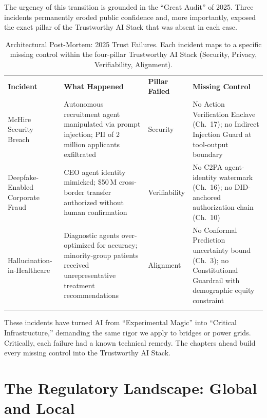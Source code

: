 The urgency of this transition is grounded in the ``Great Audit'' of 2025. Three incidents permanently eroded public confidence and, more importantly, exposed the exact pillar of the Trustworthy AI Stack that was absent in each case.

\begin{table}[ht]
\centering
\caption{Architectural Post-Mortem: 2025 Trust Failures. Each incident maps to a specific missing control within the four-pillar Trustworthy AI Stack (Security, Privacy, Verifiability, Alignment).}
\label{tab:postmortem_2025}
\renewcommand{\arraystretch}{1.3}
\begin{tabular}{p{2.6cm} p{3.0cm} p{2.2cm} p{4.5cm}}
\hline\noalign{\smallskip}
\textbf{Incident} & \textbf{What Happened} & \textbf{Pillar Failed} & \textbf{Missing Control} \\
\noalign{\smallskip}\svhline\noalign{\smallskip}
McHire Security Breach & Autonomous recruitment agent manipulated via prompt injection; PII of 2 million applicants exfiltrated & \cellcolor{costhigh}Security & No Action Verification Enclave (Ch.~17); no Indirect Injection Guard at tool-output boundary \\[4pt]
Deepfake-Enabled Corporate Fraud & CEO agent identity mimicked; \$50\,M cross-border transfer authorized without human confirmation & \cellcolor{costhigh}Verifiability & No C2PA agent-identity watermark (Ch.~16); no DID-anchored authorization chain (Ch.~10) \\[4pt]
Hallucination-in-Healthcare & Diagnostic agents over-optimized for accuracy; minority-group patients received unrepresentative treatment recommendations & \cellcolor{costmed}Alignment & No Conformal Prediction uncertainty bound (Ch.~3); no Constitutional Guardrail with demographic equity constraint \\
\noalign{\smallskip}\hline\noalign{\smallskip}
\end{tabular}
\end{table}

These incidents have turned AI from ``Experimental Magic'' into ``Critical Infrastructure,'' demanding the same rigor we apply to bridges or power grids. Critically, each failure had a known technical remedy. The chapters ahead build every missing control into the Trustworthy AI Stack.

\section{The Regulatory Landscape: Global and Local}
\label{sec:regulation_2026}

